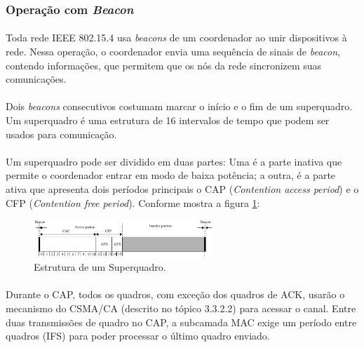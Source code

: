 
\subsubsection{Operação com \textit{Beacon}}
\paragraph{} Toda rede IEEE 802.15.4 usa \textit{beacons} de um coordenador ao unir dispositivos à rede. Nessa operação, o coordenador envia uma sequência de sinais de \textit{beacon}, contendo informações, que permitem que os nós da rede sincronizem suas comunicações. 

\paragraph{} Dois \textit{beacons} consecutivos costumam marcar o início e o fim de um superquadro. Um superquadro é uma estrutura de 16 intervalos de tempo que podem ser usados para comunicação.

\paragraph{} Um superquadro pode ser dividido em duas partes: Uma é a parte inativa que permite o coordenador entrar em modo de baixa potência; a outra, é a parte ativa que apresenta dois períodos principais o CAP (\textit{Contention access period}) e o CFP (\textit{Contention free period}). Conforme mostra a figura \ref{fig:figura8}:

\begin{figure}[!ht]
	\centering
	\includegraphics[width=0.6\textwidth]{Figuras/superquadro.PNG}   
	\caption{Estrutura de um Superquadro. \citep{IEEE2015}}
	\label{fig:figura8}
\end{figure}

\paragraph{} Durante o CAP, todos os quadros, com exceção dos quadros de ACK, usarão o mecanismo do CSMA/CA (descrito no tópico 3.3.2.2) para acessar o canal. Entre duas transmissões de quadro no CAP, a subcamada MAC exige um período entre quadros (IFS) para poder processar o último quadro enviado. 

